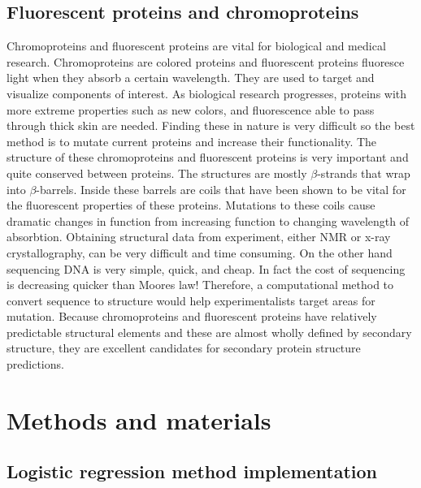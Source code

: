 \documentclass{article}
\begin{document}
\subsection{Fluorescent proteins and chromoproteins}
Chromoproteins and fluorescent proteins are vital for biological and medical research. Chromoproteins are colored proteins and fluorescent proteins fluoresce light when they absorb a certain wavelength. They are used to target and visualize components of interest. As biological research progresses, proteins with more extreme properties such as new colors, and fluorescence able to pass through thick skin are needed. Finding these in nature is very difficult so the best method is to mutate current proteins and increase their functionality. The structure of these chromoproteins and fluorescent proteins is very important and quite conserved between proteins. The structures are mostly $\beta$-strands that wrap into $\beta$-barrels. Inside these barrels are coils that have been shown to be vital for the fluorescent properties of these proteins. Mutations to these coils cause dramatic changes in function from increasing function to changing wavelength of absorbtion. Obtaining structural data from experiment, either NMR or x-ray crystallography, can be very difficult and time consuming. On the other hand sequencing DNA is very simple, quick, and cheap. In fact the cost of sequencing is decreasing quicker than Moores law! Therefore, a computational method to convert sequence to structure would help experimentalists target areas for mutation. Because chromoproteins and fluorescent proteins have relatively predictable structural elements and these are almost wholly defined by secondary structure, they are excellent candidates for secondary protein structure predictions.


\section{Methods and materials}

\subsection{Logistic regression method implementation}
\end{document}
